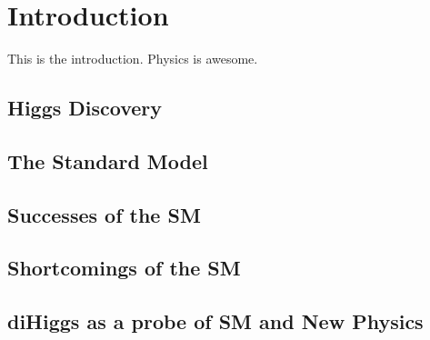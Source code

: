 
\chapter{Introduction\label{ch:intro}}

This is the introduction. Physics is awesome.

\section{Higgs Discovery\label{sec:discovery}}

\section{The Standard Model\label{sec:SM}}

\section{Successes of the SM\label{sec:SMsuccess}}

\section{Shortcomings of the SM\label{sec:SMshortcomings}}

\section{diHiggs as a probe of SM and New Physics\label{sec:diHiggs}}

